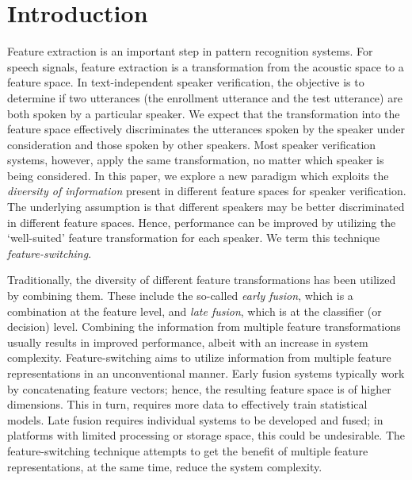 \documentclass[preprint,12pt,5p]{elsarticle}
\begin{document}
\section{Introduction}
\label{sec:intro}
Feature extraction is an important step in pattern recognition systems. For
speech signals, feature extraction is a transformation from the acoustic space
to a feature space. In text-independent speaker verification, the objective is
to determine if two utterances (the enrollment utterance and the test utterance) are
both spoken by a particular speaker. We expect that the transformation into the
feature space effectively discriminates the utterances spoken by the speaker
under consideration and those spoken by other speakers. Most speaker
verification systems, however, apply the same transformation, no matter which
speaker is being considered. In this paper, we explore a new paradigm which
exploits the \emph{diversity of information} present in different feature spaces
for speaker verification. The underlying assumption is that different speakers
may be better discriminated in different feature spaces. Hence, performance can
be improved by utilizing the `well-suited' feature transformation for
each speaker. We term this technique \emph{feature-switching}. 

Traditionally, the diversity of different feature transformations has been
utilized by combining them. These include the so-called \emph{early fusion},
which is a combination at the feature level, and \emph{late fusion}, which is at
the classifier (or decision) level. Combining the information from multiple
feature transformations usually results in improved performance, albeit
with an increase in system complexity. Feature-switching aims to utilize
information from multiple feature representations in an unconventional manner. 
Early fusion systems typically work by concatenating feature vectors;
hence, the resulting feature space is of higher dimensions. This in turn, requires
more data to effectively train statistical models. Late fusion requires
individual systems to be developed and fused; in platforms with limited
processing or storage space, this could be undesirable. The feature-switching
technique attempts to get the benefit of multiple feature representations, at the
same time, reduce the system complexity.
\end{document}
